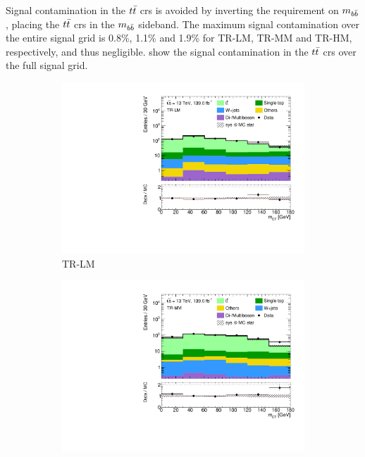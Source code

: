 Signal contamination in the $t\bar{t}$ \glspl{cr} is avoided by inverting the requirement on $m_{b\bar{b}}$, \ie placing the $t\bar{t}$ \glspl{cr} in the $m_{b\bar{b}}$ sideband. The maximum signal contamination over the entire signal grid is 0.8\%, 1.1\% and 1.9\% for TR-LM, TR-MM and TR-HM, respectively, and thus negligible.  show the signal contamination in the $t\bar{t}$ \glspl{cr} over the full signal grid. 

 \begin{figure}
	\centering
	\begin{subfigure}[b]{0.5\linewidth}
		\centering\includegraphics[width=1.0\textwidth]{1Lbb_TR-LM_mct}
		\caption{TR-LM\label{fig:signal_contamination_TRLM}}
	\end{subfigure}\hfill
	\begin{subfigure}[b]{0.5\linewidth}
		\centering\includegraphics[width=1.0\textwidth]{1Lbb_TR-MM_mct}

\end{subfigure}
\end{figure}
